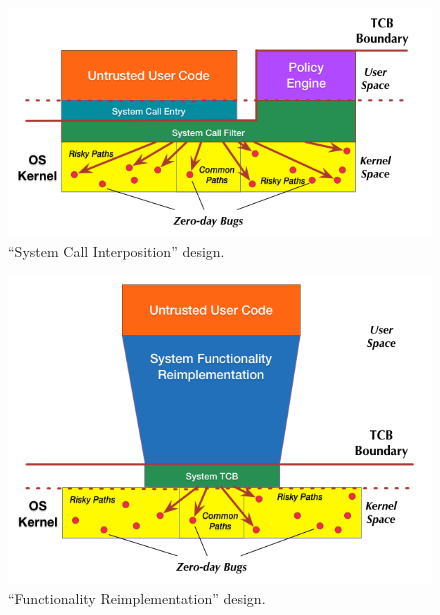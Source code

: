{\begin{figure}%
\centering
\includegraphics[width=1.0\columnwidth]{diagram/Virtualization_Design_Model_03.png}
\caption{\small ``System Call Interposition'' design.}
\label{fig:design}
\end{figure}

\begin{figure}%
\centering
\includegraphics[width=1.0\columnwidth]{diagram/Virtualization_Design_Model_02.png}
\caption{\small ``Functionality Reimplementation'' design.}
\label{fig:design}
\end{figure}

}
